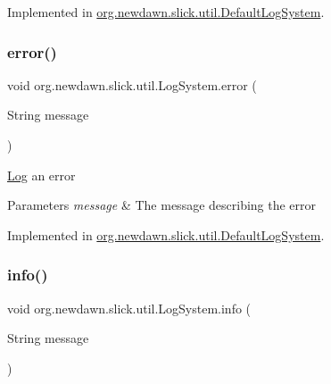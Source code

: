 Implemented in \mbox{\hyperlink{classorg_1_1newdawn_1_1slick_1_1util_1_1_default_log_system_a631253b42ce86ee0cbfdfc2df26008e8}{org.\+newdawn.\+slick.\+util.\+Default\+Log\+System}}.

\mbox{\label{interfaceorg_1_1newdawn_1_1slick_1_1util_1_1_log_system_a5ac24f5df1c272d98f386698f6b8ba2a}} 
\subsubsection{\texorpdfstring{error()}{error()}\hspace{0.1cm}{\footnotesize\ttfamily [3/3]}}
{\footnotesize\ttfamily void org.\+newdawn.\+slick.\+util.\+Log\+System.\+error (\begin{DoxyParamCaption}\item[{String}]{message }\end{DoxyParamCaption})}

\mbox{\hyperlink{classorg_1_1newdawn_1_1slick_1_1util_1_1_log}{Log}} an error


\begin{DoxyParams}{Parameters}
{\em message} & The message describing the error \\
\hline
\end{DoxyParams}


Implemented in \mbox{\hyperlink{classorg_1_1newdawn_1_1slick_1_1util_1_1_default_log_system_ae28cce21f2c8a9aacd97f571fcb1b3c2}{org.\+newdawn.\+slick.\+util.\+Default\+Log\+System}}.

\mbox{\label{interfaceorg_1_1newdawn_1_1slick_1_1util_1_1_log_system_a8430f000d206c109e47bea6a30b93be7}} 
\subsubsection{\texorpdfstring{info()}{info()}}
{\footnotesize\ttfamily void org.\+newdawn.\+slick.\+util.\+Log\+System.\+info (\begin{DoxyParamCaption}\item[{String}]{message }\end{DoxyParamCaption})}


